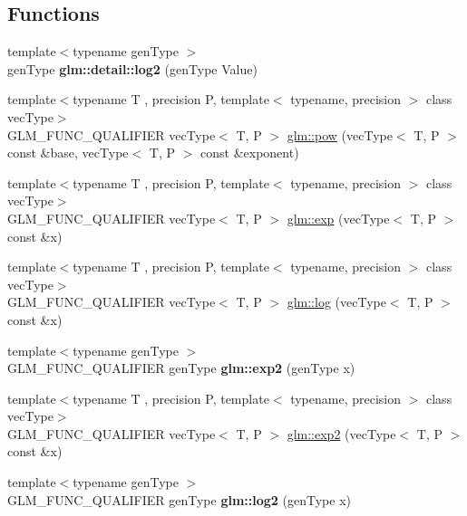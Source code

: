 \subsection*{Functions}
\begin{DoxyCompactItemize}
\item 
\hypertarget{namespaceglm_1_1detail_a3d24a612f2c5fa4f3aaf97dcd979ef1c}{{\footnotesize template$<$typename gen\-Type $>$ }\\gen\-Type {\bfseries glm\-::detail\-::log2} (gen\-Type Value)}\label{namespaceglm_1_1detail_a3d24a612f2c5fa4f3aaf97dcd979ef1c}

\item 
{\footnotesize template$<$typename T , precision P, template$<$ typename, precision $>$ class vec\-Type$>$ }\\G\-L\-M\-\_\-\-F\-U\-N\-C\-\_\-\-Q\-U\-A\-L\-I\-F\-I\-E\-R vec\-Type$<$ T, P $>$ \hyperlink{group__core__func__exponential_ga082b332a4b7c6ad1d43e09ff19e214dd}{glm\-::pow} (vec\-Type$<$ T, P $>$ const \&base, vec\-Type$<$ T, P $>$ const \&exponent)
\item 
{\footnotesize template$<$typename T , precision P, template$<$ typename, precision $>$ class vec\-Type$>$ }\\G\-L\-M\-\_\-\-F\-U\-N\-C\-\_\-\-Q\-U\-A\-L\-I\-F\-I\-E\-R vec\-Type$<$ T, P $>$ \hyperlink{group__core__func__exponential_ga25e54a7f44fc49ec6ac6ffc7675cf04a}{glm\-::exp} (vec\-Type$<$ T, P $>$ const \&x)
\item 
{\footnotesize template$<$typename T , precision P, template$<$ typename, precision $>$ class vec\-Type$>$ }\\G\-L\-M\-\_\-\-F\-U\-N\-C\-\_\-\-Q\-U\-A\-L\-I\-F\-I\-E\-R vec\-Type$<$ T, P $>$ \hyperlink{group__core__func__exponential_ga21efca311e62d233de0ae96bab126b83}{glm\-::log} (vec\-Type$<$ T, P $>$ const \&x)
\item 
\hypertarget{namespaceglm_a8f6240c6756f850537398b1af2751c4b}{{\footnotesize template$<$typename gen\-Type $>$ }\\G\-L\-M\-\_\-\-F\-U\-N\-C\-\_\-\-Q\-U\-A\-L\-I\-F\-I\-E\-R gen\-Type {\bfseries glm\-::exp2} (gen\-Type x)}\label{namespaceglm_a8f6240c6756f850537398b1af2751c4b}

\item 
{\footnotesize template$<$typename T , precision P, template$<$ typename, precision $>$ class vec\-Type$>$ }\\G\-L\-M\-\_\-\-F\-U\-N\-C\-\_\-\-Q\-U\-A\-L\-I\-F\-I\-E\-R vec\-Type$<$ T, P $>$ \hyperlink{group__core__func__exponential_ga42ca440d9062f1f456f5a9e896378f9c}{glm\-::exp2} (vec\-Type$<$ T, P $>$ const \&x)
\item 
\hypertarget{namespaceglm_ab47f0f29ead9cefd62d62ba5f83fe81b}{{\footnotesize template$<$typename gen\-Type $>$ }\\G\-L\-M\-\_\-\-F\-U\-N\-C\-\_\-\-Q\-U\-A\-L\-I\-F\-I\-E\-R gen\-Type {\bfseries glm\-::log2} (gen\-Type x)}\label{namespaceglm_ab47f0f29ead9cefd62d62ba5f83fe81b}


\end{DoxyCompactItemize}

